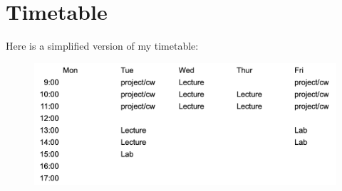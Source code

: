 \documentclass[12pt]{article}
\begin{document}
\section{Timetable}
Here is a simplified version of my timetable:

\begin{figure}[H]
    \centering
    \includegraphics[width=0.8\linewidth]{timetable}
\end{figure}
\end{document}
